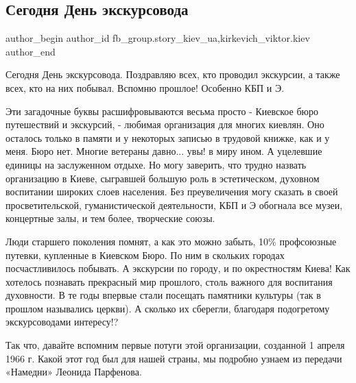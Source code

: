  
 
 
 
 
 
\subsection{Сегодня День экскурсовода}
\label{sec:21_02_2022.fb.fb_group.story_kiev_ua.1.den_ekskursovoda}
 
\ifcmt
 author_begin
   author_id fb_group.story_kiev_ua,kirkevich_viktor.kiev
 author_end
\fi

Сегодня День экскурсовода. Поздравляю всех, кто проводил экскурсии, а также
всех, кто на них побывал. Вспомню прошлое! Особенно КБП и Э.

Эти загадочные буквы расшифровываются весьма просто - Киевское бюро путешествий
и экскурсий, - любимая организация для многих киевлян. Оно осталось только в
памяти и у некоторых записью в трудовой книжке, как и у меня. Бюро нет. Многие
ветераны давно... увы! в миру ином. А уцелевшие единицы на заслуженном отдыхе. Но
могу заверить, что трудно назвать организацию в Киеве, сыгравшей большую роль в
эстетическом, духовном воспитании широких слоев населения. Без преувеличения
могу сказать в своей просветительской, гуманистической деятельности, КБП и Э
обогнала все музеи, концертные залы, и тем более, творческие союзы.

Люди старшего поколения помнят, а как это можно забыть, 10\% профсоюзные
путевки, купленные в Киевском Бюро. По ним в скольких городах посчастливилось
побывать. А экскурсии по городу, и по окрестностям Киева! Как хотелось
познавать прекрасный мир прошлого, столь важного для воспитания духовности. В
те годы впервые стали посещать памятники культуры (так в прошлом назывались
церкви). А сколько их сберегли, благодаря подогретому экскурсоводами интересу!?

Так что, давайте вспомним первые потуги этой организации, созданной 1 апреля
1966 г. Какой этот год был для нашей страны, мы подробно узнаем из передачи
«Намедни» Леонида Парфенова.

